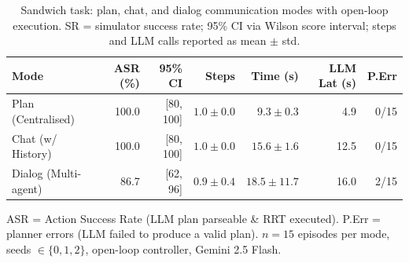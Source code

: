 \begin{table}[t]
  \centering
  \caption{Sandwich task: plan, chat, and dialog communication modes with open-loop execution. SR = simulator success rate; 95\% CI via Wilson score interval; steps and LLM calls reported as mean $\pm$ std.}
  \label{tab:sandwich_open_loop}
  \begin{tabular}{lrrrrrr}
    \toprule
    \textbf{Mode} & \textbf{ASR (\%)} & \textbf{95\% CI} & \textbf{Steps} & \textbf{Time (s)} & \textbf{LLM Lat (s)} & \textbf{P.Err} \\
    \midrule
    Plan (Centralised) & 100.0 & [80, 100] & $1.0 \pm 0.0$ & $9.3 \pm 0.3$ & 4.9 & 0/15 \\
    Chat (w/ History) & 100.0 & [80, 100] & $1.0 \pm 0.0$ & $15.6 \pm 1.6$ & 12.5 & 0/15 \\
    Dialog (Multi-agent) & 86.7 & [62, 96] & $0.9 \pm 0.4$ & $18.5 \pm 11.7$ & 16.0 & 2/15 \\
    \bottomrule
  \end{tabular}
  \footnotesize{ASR = Action Success Rate (LLM plan parseable \& RRT executed). P.Err = planner errors (LLM failed to produce a valid plan). $n=15$ episodes per mode, seeds $\in \{0,1,2\}$, open-loop controller, Gemini 2.5 Flash.}
\end{table}
